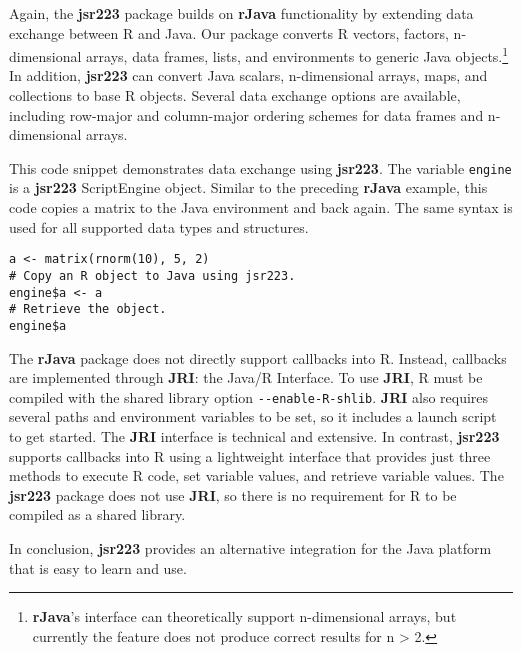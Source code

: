 Again, the \textbf{jsr223} package builds on \textbf{rJava} functionality by extending data exchange between R and Java. Our package converts R vectors, factors, n-dimensional arrays, data frames, lists, and environments to generic Java objects.\footnote{\textbf{rJava}'s interface can theoretically support n-dimensional arrays, but currently the feature does not produce correct results for n > 2.} In addition, \textbf{jsr223} can convert Java scalars, n-dimensional arrays, maps, and collections to base R objects. Several data exchange options are available, including row-major and column-major ordering schemes for data frames and n-dimensional arrays. %

This code snippet demonstrates data exchange using \textbf{jsr223}. The variable \texttt{engine} is a \textbf{jsr223} ScriptEngine object. Similar to the preceding \textbf{rJava} example, this code copies a matrix to the Java environment and back again. The same syntax is used for all supported data types and structures.

\singlespace
\begin{verbatim}
a <- matrix(rnorm(10), 5, 2)
# Copy an R object to Java using jsr223.
engine$a <- a
# Retrieve the object.
engine$a
\end{verbatim}
\doublespace

The \textbf{rJava} package does not directly support callbacks into R. Instead, callbacks are implemented through \textbf{JRI}: the Java/R Interface. To use \textbf{JRI}, R must be compiled with the shared library option \texttt{-{}-enable-R-shlib}. \textbf{JRI} also requires several paths and environment variables to be set, so it includes a launch script to get started. The \textbf{JRI} interface is technical and extensive. In contrast, \textbf{jsr223} supports callbacks into R using a lightweight interface that provides just three methods to execute R code, set variable values, and retrieve variable values. The \textbf{jsr223} package does not use \textbf{JRI}, so there is no requirement for R to be compiled as a shared library.

In conclusion, \textbf{jsr223} provides an alternative integration for the Java platform that is easy to learn and use.
